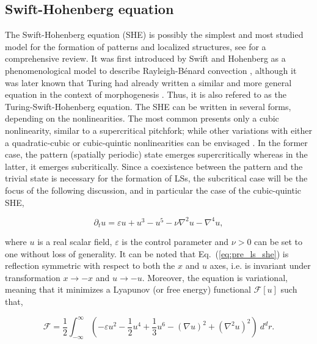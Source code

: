 \subsection{Swift-Hohenberg equation}

The Swift-Hohenberg equation (SHE) is possibly the simplest and most studied model 
for the formation of patterns and localized structures, see \cite{cross1993pattern,knobloch2015spatial}
for a comprehensive review. It was first introduced
by Swift and Hohenberg as a phenomenological model to describe Rayleigh-Bénard
convection \cite{swift1977hydrodynamic,pomeau1979stability}, although it was later 
known that Turing had already written 
a similar and more general equation in the context of morphogenesis \cite{dawes2016after}.
Thus, it is also refered to as the Turing-Swift-Hohenberg equation.
The SHE can be written in several forms, depending on the nonlinearities. The most common
presents only a cubic nonlinearity, similar to a supercritical pitchfork; while other
variations with either a quadratic-cubic or cubic-quintic nonlinearities can be envisaged \cite{burke2007snakes,knobloch2015spatial}.
In the former case, the pattern (spatially periodic) state emerges supercritically whereas in the latter,
it emerges subcritically. Since a coexistence between the pattern and the trivial state is necessary for the formation of LSs,
the subcritical case will be the focus of the following discussion, and in particular the case of 
the cubic-quintic SHE,

\begin{equation}
    \partial_t u = \varepsilon u + u ^3 - u^5 - \nu \nabla^2 u - \nabla^4 u,
    \label{eq:pre_ls_she}
\end{equation}

\noindent where $u$ is a real scalar field, $\varepsilon$ is the control parameter and $\nu>0$ can be set to
one without loss of generality. It can be noted that Eq.~(\ref{eq:pre_ls_she}) is reflection symmetric
with respect to both the $x$ and $u$ axes, i.e. is invariant under transformation $x\to -x$ and $u\to -u$.
Moreover, the equation is variational, meaning that it minimizes a Lyapunov (or free energy) functional
$\mathcal{F}[u]$ such that,

\begin{equation}
    \mathcal{F} = \dfrac12 \int_{-\infty}^{\infty} \left( -\varepsilon u^2 - \dfrac12 u^4 + \dfrac13 u^6 - (\nabla u)^2 + (\nabla^2 u)^2 \right) \ d^dr.
\end{equation}

